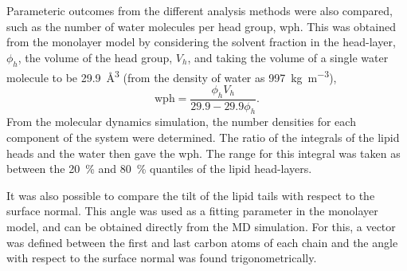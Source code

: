 \documentclass[amsmath,amssymb,twocolumn,superscriptaddress,aps,prl]{revtex4-1}
\begin{document}
Parameteric outcomes from the different analysis methods were also compared, such as the number of water molecules per head group, wph.
This was obtained from the monolayer model by considering the solvent fraction in the head-layer, $\phi_h$, the volume of the head group, $V_h$, and taking the volume of a single water molecule to be \SI{29.9}{\cubic\angstrom} (from the density of water as \SI{997}{\kilo\gram\per\cubic\meter}),
%
\begin{equation}
  \text{wph} = \frac{\phi_hV_h}{29.9 - 29.9\phi_h}.
  \label{equ:wph}
\end{equation}
%
From the molecular dynamics simulation, the number densities for each component of the system were determined.
The ratio of the integrals of the lipid heads and the water then gave the wph.
The range for this integral was taken as between the \SI{20}{\percent} and \SI{80}{\percent} quantiles of the lipid head-layers.

It was also possible to compare the tilt of the lipid tails with respect to the surface normal.
This angle was used as a fitting parameter in the monolayer model, and can be obtained directly from the MD simulation.
For this, a vector was defined between the first and last carbon atoms of each chain and the angle with respect to the surface normal was found trigonometrically.
\end{document}
